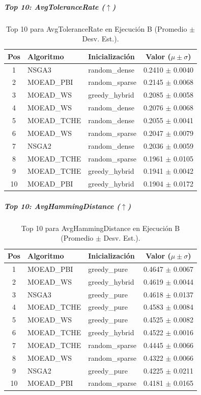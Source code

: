 \subparagraph{Top 10: AvgToleranceRate ($\uparrow$)}
\begin{table}[H]
    \centering
    \begin{tabular}{cllc}
        \toprule
        Pos & Algoritmo & Inicialización & Valor ($\mu \pm \sigma$) \\
        \midrule
        1 & NSGA3 & random\_dense & 0.2410 $\pm$ 0.0040 \\
        2 & MOEAD\_PBI & random\_sparse & 0.2145 $\pm$ 0.0068 \\
        3 & MOEAD\_WS & greedy\_hybrid & 0.2085 $\pm$ 0.0058 \\
        4 & MOEAD\_WS & random\_dense & 0.2076 $\pm$ 0.0068 \\
        5 & MOEAD\_TCHE & random\_dense & 0.2055 $\pm$ 0.0041 \\
        6 & MOEAD\_WS & random\_sparse & 0.2047 $\pm$ 0.0079 \\
        7 & NSGA2 & random\_dense & 0.2036 $\pm$ 0.0059 \\
        8 & MOEAD\_TCHE & random\_sparse & 0.1961 $\pm$ 0.0105 \\
        9 & MOEAD\_TCHE & greedy\_hybrid & 0.1941 $\pm$ 0.0042 \\
        10 & MOEAD\_PBI & greedy\_hybrid & 0.1904 $\pm$ 0.0172 \\
        \bottomrule
    \end{tabular}
    \caption{Top 10 para AvgToleranceRate en Ejecución B (Promedio $\pm$ Desv. Est.).}
\end{table}

\subparagraph{Top 10: AvgHammingDistance ($\uparrow$)}
\begin{table}[H]
    \centering
    \begin{tabular}{cllc}
        \toprule
        Pos & Algoritmo & Inicialización & Valor ($\mu \pm \sigma$) \\
        \midrule
        1 & MOEAD\_PBI & greedy\_pure & 0.4647 $\pm$ 0.0067 \\
        2 & MOEAD\_WS & greedy\_hybrid & 0.4619 $\pm$ 0.0044 \\
        3 & NSGA3 & greedy\_pure & 0.4618 $\pm$ 0.0137 \\
        4 & MOEAD\_TCHE & greedy\_pure & 0.4583 $\pm$ 0.0084 \\
        5 & MOEAD\_WS & greedy\_pure & 0.4525 $\pm$ 0.0082 \\
        6 & MOEAD\_TCHE & greedy\_hybrid & 0.4522 $\pm$ 0.0016 \\
        7 & MOEAD\_TCHE & random\_sparse & 0.4445 $\pm$ 0.0066 \\
        8 & MOEAD\_WS & random\_sparse & 0.4322 $\pm$ 0.0066 \\
        9 & NSGA2 & greedy\_pure & 0.4225 $\pm$ 0.0211 \\
        10 & MOEAD\_PBI & random\_sparse & 0.4181 $\pm$ 0.0165 \\
        \bottomrule
    \end{tabular}
    \caption{Top 10 para AvgHammingDistance en Ejecución B (Promedio $\pm$ Desv. Est.).}
\end{table}

